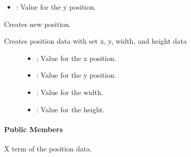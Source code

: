 \documentclass[letterpaper,10pt,english]{sphinxmanual}
\begin{document}
\begin{fulllineitems}
\begin{fulllineitems}
\begin{description}
\begin{itemize}
\item {} 
: Value for the y position. 

\end{itemize}

\end{description}


\end{fulllineitems}


\begin{fulllineitems}
\label{\detokenize{index:_CPPv2N7ostendo3Pos3PosEiiii}}%
\pysigstartmultiline
{}\label{\detokenize{index:Pessumstructostendo_1_1Pos_1a3401ddc5e051daa5d6e485fc3c12edcf}}%
\pysigstopmultiline
Creates new position. 

Creates position data with set x, y, width, and height data \begin{description}
\item[{}] \leavevmode\begin{itemize}
\item {} 
: Value for the x position. 

\item {} 
: Value for the y position. 

\item {} 
: Value for the width. 

\item {} 
: Value for the height. 

\end{itemize}

\end{description}


\end{fulllineitems}

\paragraph{Public Members}

\begin{fulllineitems}
\label{\detokenize{index:_CPPv2N7ostendo3Pos1xE}}%
\pysigstartmultiline
{}%
\pysigstopmultiline
X term of the position data. 


\end{fulllineitems}
\end{fulllineitems}
\end{document}
